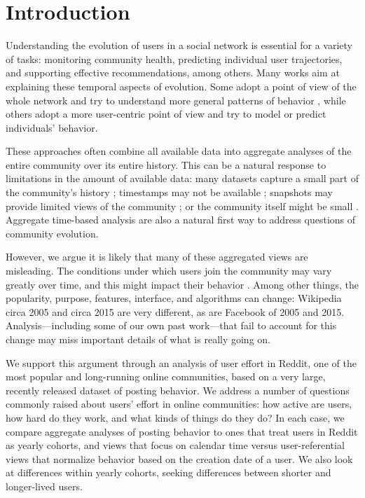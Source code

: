 
\section{Introduction}

Understanding the evolution of users in a social network is essential for a variety of tasks: monitoring community health, predicting individual user trajectories, and supporting effective recommendations, among others.  Many works aim at explaining these temporal aspects of evolution. Some adopt a point of view of the whole network and try to understand more general patterns of behavior \cite{Zhu2014, Kooti2010}, while others adopt a more user-centric point of view and try to model \cite{Correa2010, Priedhorsky2007, Panciera2009, Welser2011} or predict \cite{Danescu-niculescu-mizil2013} individuals' behavior.

These approaches often combine all available data into aggregate analyses of the entire community over its entire history.  This can be a natural response to limitations in the amount of available data: many datasets capture a small part of the community's history \cite{Artzi2012}; timestamps may not be available \cite{Priedhorsky2007, Pujol2010}; snapshots may provide limited views of the community \cite{Cosley2010}; or the community itself might be small \cite{Lewis2008}.  Aggregate time-based analysis are also a natural first way to address questions of community evolution.

However, we argue it is likely that many of these aggregated views are misleading. The conditions under which users join the community may vary greatly over time, and this might impact their behavior \cite{Miller2015}.  Among other things, the popularity, purpose, features, interface, and algorithms can change: Wikipedia circa 2005 and circa 2015 are very different, as are Facebook of 2005 and 2015.  Analysis---including some of our own past work---that fail to account for this change may miss important details of what is really going on.

We support this argument through an analysis of user effort in Reddit, one of the most popular and long-running online communities, based on a very large, recently released dataset of posting behavior.  We address a number of questions commonly raised about users' effort in online communities: how active are users, how hard do they work, and what kinds of things do they do?  In each case, we compare aggregate analyses of posting behavior to ones that treat users in Reddit as yearly cohorts, and views that focus on calendar time versus user-referential views that normalize behavior based on the creation date of a user.  We also look at differences within yearly cohorts, seeking differences between shorter and longer-lived users.

